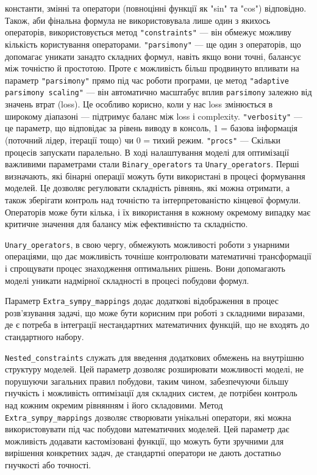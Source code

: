 \documentclass[14pt,a4paper,titlepage,oneside]{book}
\numberwithin{equation}{part}
\begin{document}
    константи, змінні та оператори (повноцінні функції як "sin" та "cos") відповідно. Також,
    аби фінальна формула не використовувала лише один з якихось операторів, використовується
    метод \texttt{"constraints"} — він обмежує можливу кількість користування операторами.
    \texttt{"parsimony"} — ще один з операторів, що допомагає уникати занадто складних формул,
    навіть якщо вони точні, балансує між точністю й простотою. Проте є можливість
    більш продвинуто впливати на параметр \texttt{"parsimony"} прямо під час роботи програми,
    це метод \texttt{"adaptive parsimony scaling"} — він автоматично масштабує вплив
    \texttt{parsimony} залежно від значень втрат (loss). Це особливо корисно, коли у нас
    loss змінюється в широкому діапазоні — підтримує баланс між loss і complexity.
    \texttt{"verbosity"} — це параметр, що відповідає за рівень виводу в консоль,
    1 = базова інформація (поточний лідер, ітерації тощо) чи 0 = тихий режим.
    \texttt{"procs"} — Скільки процесів запускати паралельно.
    В ході налаштування моделі для оптимізації важливими параметрами стали \texttt{Binary\_operators} та \texttt{Unary\_operators}. Перші визначають, які бінарні операції можуть бути використані в процесі формування моделей. Це дозволяє регулювати складність рівнянь, які можна отримати, а також зберігати контроль над точністю та інтерпретованістю кінцевої формули. Операторів може бути кілька, і їх використання в кожному окремому випадку має критичне значення для балансу між ефективністю та складністю.

\texttt{Unary\_operators}, в свою чергу, обмежують можливості роботи з унарними операціями, що дає можливість точніше контролювати математичні трансформації і спрощувати процес знаходження оптимальних рішень. Вони допомагають моделі уникати надмірної складності в процесі побудови формул.

Параметр \texttt{Extra\_sympy\_mappings} додає додаткові відображення в процес розв'язування задачі, що може бути корисним при роботі з складними виразами, де є потреба в інтеграції нестандартних математичних функцій, що не входять до стандартного набору.

\texttt{Nested\_constraints} служать для введення додаткових обмежень на внутрішню структуру моделей. Цей параметр дозволяє розширювати можливості моделі, не порушуючи загальних правил побудови, таким чином, забезпечуючи більшу гнучкість і можливість оптимізації для складних систем, де потрібен контроль над кожним окремим рівнянням і його складовими.
Метод \texttt{Extra\_sympy\_mappings} дозволяє створювати унікальні оператори, які можна використовувати під час побудови математичних моделей. Цей параметр дає можливість додавати кастомізовані функції, що можуть бути зручними для вирішення конкретних задач, де стандартні оператори не дають достатньо гнучкості або точності.
\end{document}
